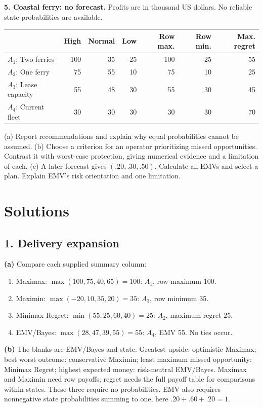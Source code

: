 \textbf{5. Coastal ferry: no forecast.} Profits are in thousand US dollars. No reliable state probabilities are available.
\begin{center}\begin{tabular}{lrrr|rrr}\toprule
& High & Normal & Low & Row max. & Row min. & Max. regret\\\midrule
$A_1$: Two ferries &100&35&-25&100&-25&55\\
$A_2$: One ferry &75&55&10&75&10&25\\
$A_3$: Lease capacity &55&48&30&55&30&45\\
$A_4$: Current fleet &30&30&30&30&30&70\\\bottomrule
\end{tabular}\end{center}
(a) Report recommendations and explain why equal probabilities cannot be assumed. (b) Choose a criterion for an operator prioritizing missed opportunities. Contrast it with worst-case protection, giving numerical evidence and a limitation of each. (c) A later forecast gives $(.20,.30,.50)$. Calculate all EMVs and select a plan. Explain EMV's risk orientation and one limitation.
\answerlines\answerlines
\endgroup
\restoregeometry
\renewcommand{\baselinestretch}{1}\normalsize
\section*{Solutions}
\subsection*{1. Delivery expansion}
\textbf{(a)} Compare each supplied summary column:
\begin{enumerate}[label=\roman*.]
\item Maximax: $\max(100,75,40,65)=100$: $A_1$, row maximum 100.
\item Maximin: $\max(-20,10,35,20)=35$: $A_3$, row minimum 35.
\item Minimax Regret: $\min(55,25,60,40)=25$: $A_2$, maximum regret 25.
\item EMV/Bayes: $\max(28,47,39,55)=55$: $A_4$, EMV 55. No ties occur.
\end{enumerate}
\textbf{(b)} The blanks are EMV/Bayes and state. Greatest upside: optimistic Maximax; best worst outcome: conservative Maximin; least maximum missed opportunity: Minimax Regret; highest expected money: risk-neutral EMV/Bayes. Maximax and Maximin need row payoffs; regret needs the full payoff table for comparisons within states. These three require no probabilities. EMV also requires nonnegative state probabilities summing to one, here $.20+.60+.20=1$.

